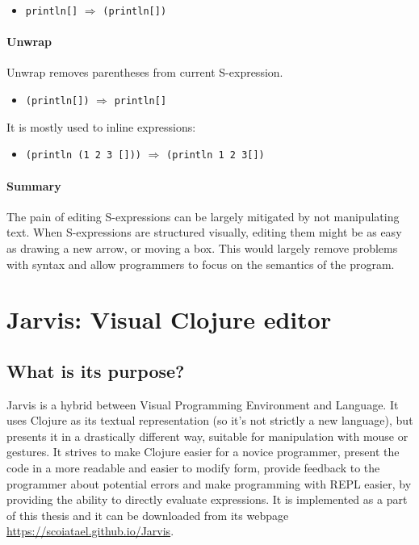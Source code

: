 \documentclass[english,mgr,shortabstract]{iithesis}
\begin{document}
\begin{itemize}
\item \lstinline|println[]| $\Rightarrow$ \lstinline|(println[])|
\end{itemize}

\subsubsection{Unwrap}
Unwrap removes parentheses from current S-expression.
\begin{itemize}
  \item \lstinline|(println[])| $\Rightarrow$ \lstinline|println[]|
\end{itemize}

It is mostly used to inline expressions:
\begin{itemize}
  \item \lstinline|(println (1 2 3 []))| $\Rightarrow$
    \lstinline|(println 1 2 3[])|
\end{itemize}

\subsubsection{Summary}
The pain of editing S-expressions can be largely mitigated by not manipulating
text.
When S-expressions are structured visually, editing them might be as easy as
drawing a new arrow, or moving a box.
This would largely remove problems with syntax and allow programmers to focus on
the semantics of the program.


\chapter{Jarvis: Visual Clojure editor}
\section{What is its purpose?}
Jarvis is a hybrid between Visual Programming Environment and Language.
It uses Clojure as its textual representation (so it’s not strictly a new
language), but presents it in a drastically different way, suitable for
manipulation with mouse or gestures.
It strives to make Clojure easier for a novice programmer, present the code in a
more readable and easier to modify form, provide feedback to the programmer
about potential errors and make programming with REPL easier, by providing the
ability to directly evaluate expressions.
It is implemented as a part of this thesis and it can be downloaded from its
webpage \url{https://scoiatael.github.io/Jarvis}.
\end{document}
